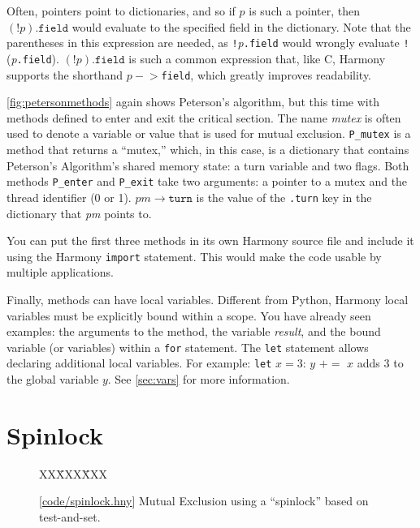 \documentclass{report}
\newcommand{\harmonysource}[1]{
\begin{tabbing}
XX\=XXX\=XXX\kill
    
\end{tabbing}
}
\newcommand{\harmonylink}[1]{%
[\href{https://harmony.cs.cornell.edu/#1}{\underline{#1}}]%
}
\newenvironment{code}{
\tcolorbox
}{
\endtcolorbox
}
\begin{document}
Often, pointers point to dictionaries, and so if $p$ is such a pointer,
then $(!p).\mathtt{field}$ would evaluate to the specified field in the dictionary.
Note that the parentheses in this expression
are needed, as \texttt{!}\textit{p}\texttt{.field} would wrongly evaluate
\texttt{!}(\textit{p}\texttt{.field}).
$(!p).\mathtt{field}$ is such a common expression that, like C, Harmony supports the
shorthand $p-$$>$\texttt{field}, which greatly improves readability.

\autoref{fig:petersonmethods} again shows Peterson's algorithm,
but this time with methods defined to enter and exit the critical
section.
The name \textit{mutex} is often used to denote a variable or value
that is used for mutual exclusion.
\texttt{P\_mutex} is a method that returns a ``mutex,'' which, in this
case, is a dictionary that contains Peterson's Algorithm's shared memory state:
a turn variable and two flags.
Both methods \texttt{P\_enter} and \texttt{P\_exit} take two arguments:
a pointer to a mutex and the thread identifier (0 or 1).
$\mathit{pm}$$\rightarrow$$\mathtt{turn}$ is the value of the \texttt{.turn} key
in the dictionary that \textit{pm} points to. 

You can put the first three methods in its own Harmony source file
and include it using the Harmony \texttt{import} statement.
%
%
This would make the code usable by multiple applications.

Finally, methods can have local variables.
Different from Python, Harmony local variables must be
explicitly bound within a scope.
You have already seen examples: the arguments to the method,
the variable \textit{result}, and the bound variable (or
variables) within a \texttt{for} statement.
The \texttt{let} statement allows declaring additional
local variables.  For example:
\texttt{let} $x = 3$: $y$ $+$$=$ $x$ adds 3 to the global variable
$y$.
See \autoref{sec:vars} for more information.

\chapter{Spinlock}
\label{ch:spinlock}
%

%

\begin{figure}
\begin{code}
\harmonysource{spinlock}
\end{code}
\caption{\harmonylink{code/spinlock.hny} Mutual Exclusion using a ``spinlock'' based on test-and-set.}
\label{fig:tas}
\end{figure}
\end{document}
